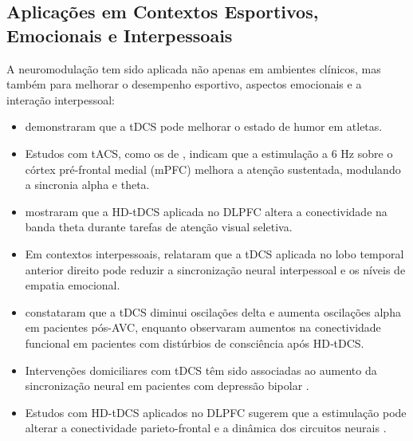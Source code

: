 \subsection{Aplicações em Contextos Esportivos, Emocionais e Interpessoais}
A neuromodulação tem sido aplicada não apenas em ambientes clínicos, mas também para melhorar o desempenho esportivo, aspectos emocionais e a interação interpessoal:
\begin{itemize}
    \item {} demonstraram que a tDCS pode melhorar o estado de humor em atletas.
    \item Estudos com tACS, como os de , indicam que a estimulação a 6 Hz sobre o córtex pré-frontal medial (mPFC) melhora a atenção sustentada, modulando a sincronia alpha e theta.
    \item {} mostraram que a HD-tDCS aplicada no DLPFC altera a conectividade na banda theta durante tarefas de atenção visual seletiva.
    \item Em contextos interpessoais,  relataram que a tDCS aplicada no lobo temporal anterior direito pode reduzir a sincronização neural interpessoal e os níveis de empatia emocional.
    \item {} constataram que a tDCS diminui oscilações delta e aumenta oscilações alpha em pacientes pós-AVC, enquanto  observaram aumentos na conectividade funcional em pacientes com distúrbios de consciência após HD‑tDCS.
    \item Intervenções domiciliares com tDCS têm sido associadas ao aumento da sincronização neural em pacientes com depressão bipolar \cite{xiao2025enhanced}.
    \item Estudos com HD-tDCS aplicados no DLPFC sugerem que a estimulação pode alterar a conectividade parieto-frontal e a dinâmica dos circuitos neurais \cite{arif2021high}.
\end{itemize}

